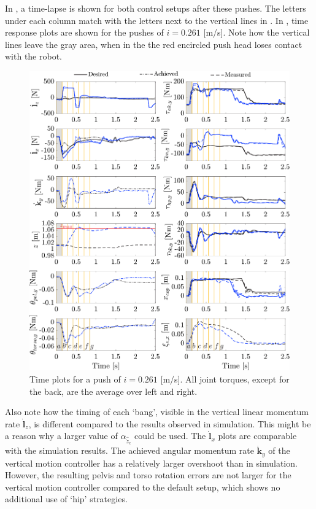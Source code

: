 In , a time-lapse is shown for both control setups after these pushes. The letters under each column match with the letters next to the vertical lines in . In , time response plots are shown for the pushes of $i=0.261$ [m/s]. Note how the vertical lines leave the gray area, when in the  the red encircled push head loses contact with the robot. 
\begin{figure}
\centering
\includegraphics[width=1.0\textwidth]{STYLESTUFF/valcomparetimeHW.png}
\caption{Time plots for a push of $i=0.261$ [m/s]. All joint torques, except for the back, are the average over left and right.}
\label{fig:valcomparetimeHW}
\end{figure}

Also note how the timing of each `bang', visible in the vertical linear momentum rate $\dot{\mathbf{l}}_z$, is different compared to the results observed in simulation. This might be a reason why a larger value of $\alpha_{\hat{\ddot{z}}_{c}}$ could be used. The $\dot{\mathbf{l}}_x$ plots are comparable with the simulation results. The achieved angular momentum rate $\dot{\mathbf{k}}_y$ of the vertical motion controller has a relatively larger overshoot than in simulation. However, the resulting pelvis and torso rotation errors are not larger for the vertical motion controller compared to the default setup, which shows no additional use of `hip' strategies. 

